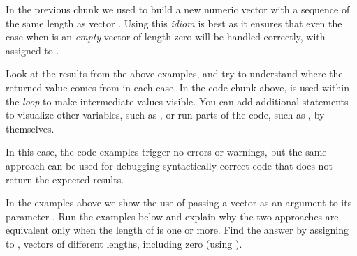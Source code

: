 \documentclass[krantz2]{krantz}\usepackage{knitr}
\begin{document}
In the previous chunk we used  to build a new numeric vector with a sequence of the same length as vector . Using this \emph{idiom} is best as it ensures that even the case when  is an \emph{empty} vector of length zero will be handled correctly, with  assigned to .

\begin{playground}\label{box:play:forloop}
Look at the results from the above examples, and try to understand where the returned value comes from in each case. In the code chunk above,  is used within the \emph{loop} to make intermediate values visible. You can add additional  statements to visualize other variables, such as , or run parts of the code, such as , by themselves.

In this case, the code examples trigger no errors or warnings, but the same approach can be used for debugging syntactically correct code that does not return the expected results.
\end{playground}

\begin{advplayground}
In the examples above we show the use of  passing a vector as an argument to its parameter . Run the examples below and explain why the two approaches are equivalent only when the length of  is one or more. Find the answer by assigning to , vectors of different lengths, including zero (using ).

\begin{knitrout}\footnotesize
{}\color{fgcolor}\begin{kframe}
\begin{alltt}
 \hlkwb{<-} \hlstd{(}
  \hlstd{(} 
   \hlkwb{<-} \hlopt{^}
\hlstd{\}}

 \hlkwb{<-} \hlstd{(}
  \hlopt{:}
   \hlkwb{<-} \hlopt{^}
\hlstd{\}}
\end{alltt}
\end{kframe}
\end{knitrout}

\end{advplayground}
\end{document}
